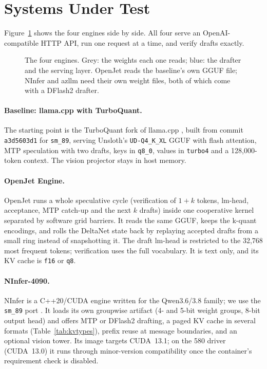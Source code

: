 \section{Systems Under Test}
\label{sec:systems}

Figure~\ref{fig:systems} shows the four engines side by side. All four serve an
OpenAI-compatible HTTP API, run one request at a time, and verify drafts exactly.

\begin{figure}[t]
  \centering
  
  \caption{The four engines. Grey: the weights each one reads; blue: the drafter and the
           serving layer. OpenJet reads the baseline's own GGUF file; NInfer and azllm need their
           own weight files, both of which come with a DFlash2 drafter.}
  \label{fig:systems}
\end{figure}

\paragraph{Baseline: llama.cpp with TurboQuant.}
The starting point is the TurboQuant fork of llama.cpp \citep{turboquant}, built from commit
\texttt{a3d5603d1} for \texttt{sm\_89}, serving Unsloth's \texttt{UD-Q4\_K\_XL} GGUF
 with flash attention, MTP speculation with two drafts, keys in
\texttt{q8\_0}, values in \texttt{turbo4} and a 128{,}000-token context. The vision projector
stays in host memory.

\paragraph{OpenJet Engine.}
OpenJet \citep{openjet} runs a whole speculative cycle (verification of $1+k$ tokens, lm-head,
acceptance, MTP catch-up and the next $k$ drafts) inside one cooperative kernel separated by
software grid barriers. It reads the same GGUF, keeps the k-quant encodings, and rolls the
DeltaNet state back by replaying accepted drafts from a small ring instead of snapshotting it.
The draft lm-head is restricted to the 32{,}768 most frequent tokens; verification uses the full
vocabulary. It is text only, and its KV cache is \texttt{f16} or \texttt{q8}.

\paragraph{NInfer-4090.}
NInfer \citep{ninfer} is a C++20/CUDA engine written for the Qwen3.6/3.8 family; we use the
\texttt{sm\_89} port \citep{ninfer4090}. It loads its own groupwise artifact
(4- and 5-bit weight groups, 8-bit output head) and offers MTP or DFlash2 drafting, a paged KV
cache in several formats (Table~\ref{tab:kvtypes}), prefix reuse at message boundaries, and an
optional vision tower. Its image targets CUDA~13.1; on the 580 driver (CUDA~13.0) it runs through
minor-version compatibility once the container's requirement check is disabled.

